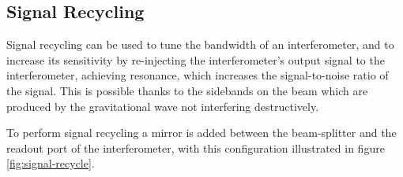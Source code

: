 \subsection{Signal Recycling}
\label{sec:signal-recycling}
%
%
Signal recycling can be used to tune the bandwidth of an
interferometer, and to increase its sensitivity by re-injecting the
interferometer's output signal to the interferometer, achieving
resonance, which increases the signal-to-noise ratio of the
signal. This is possible thanks to the sidebands on the beam which are
produced by the gravitational wave not interfering destructively.

To perform signal recycling a mirror is added between the
beam-splitter and the readout port of the interferometer, with this
configuration illustrated in figure \ref{fig:signal-recycle}.

